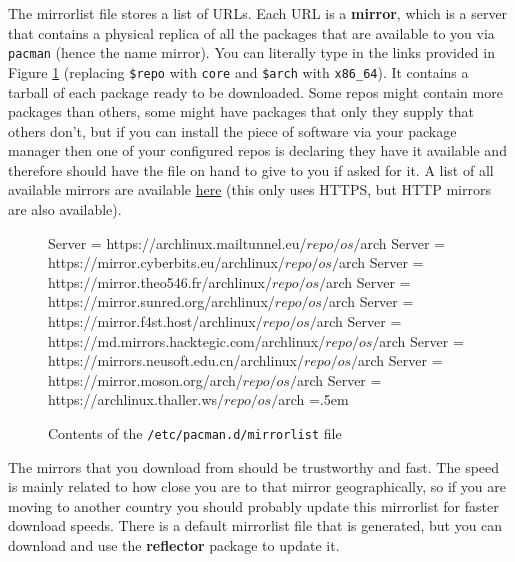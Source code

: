 \documentclass{article}
\theoremstyle{definition}
\newenvironment{cverbatim}
    {\SaveVerbatim{cverb}}
    {\endSaveVerbatim
    \flushleft\fboxrule=0pt\fboxsep=.5em
    \colorbox{cverbbg}{%
      \makebox[\dimexpr\linewidth-2\fboxsep][l]{\BUseVerbatim{cverb}}%
    }
    \endflushleft
  }
\begin{document}
    The mirrorlist file stores a list of URLs. Each URL is a \textbf{mirror}, which is a server that contains a physical replica of all the packages that are available to you via \texttt{pacman} (hence the name mirror). You can literally type in the links provided in Figure \ref{fig:mirrorlist} (replacing \texttt{\$repo} with \texttt{core} and \texttt{\$arch} with \texttt{x86\_64}). It contains a tarball of each package ready to be downloaded. Some repos might contain more packages than others, some might have packages that only they supply that others don’t, but if you can install the piece of software via your package manager then one of your configured repos is declaring they have it available and therefore should have the file on hand to give to you if asked for it. A list of all available mirrors are available \href{https://archlinux.org/mirrorlist/all/https/}{here} (this only uses HTTPS, but HTTP mirrors are also available).  

    \begin{figure}
      \begin{cverbatim}
        Server = https://archlinux.mailtunnel.eu/$repo/os/$arch
        Server = https://mirror.cyberbits.eu/archlinux/$repo/os/$arch
        Server = https://mirror.theo546.fr/archlinux/$repo/os/$arch
        Server = https://mirror.sunred.org/archlinux/$repo/os/$arch
        Server = https://mirror.f4st.host/archlinux/$repo/os/$arch
        Server = https://md.mirrors.hacktegic.com/archlinux/$repo/os/$arch
        Server = https://mirrors.neusoft.edu.cn/archlinux/$repo/os/$arch
        Server = https://mirror.moson.org/arch/$repo/os/$arch
        Server = https://archlinux.thaller.ws/$repo/os/$arch
      \end{cverbatim}
      \caption{Contents of the \texttt{/etc/pacman.d/mirrorlist} file}\label{fig:mirrorlist}
    \end{figure}
    
    The mirrors that you download from should be trustworthy and fast. The speed is mainly related to how close you are to that mirror geographically, so if you are moving to another country you should probably update this mirrorlist for faster download speeds. There is a default mirrorlist file that is generated, but you can download and use the \textbf{reflector} package to update it.  
\end{document}
